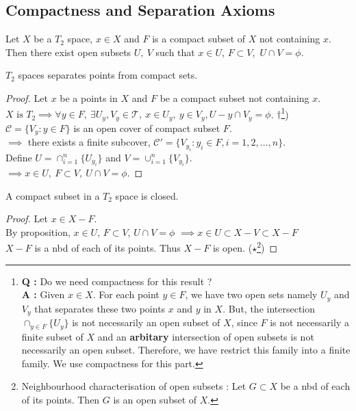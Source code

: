 \subsection{Compactness and Separation Axioms}
\cite[chapter 7 \S 2.1-10]{joshi}
\begin{proposition}
	Let $X$ be a $T_2$ space, $x \in X$ and $F$ is a compact subset of $X$ not containing $x$.
	Then there exist open subsets $U,\ V$ such that $x \in U$, $F \subset V$,\ $U \cap V = \phi$.
\end{proposition}
\begin{commentary}
	$T_2$ spaces separates points from compact sets.
\end{commentary}
\begin{proof}
	Let $x$ be a points in $X$ and $F$ be a compact subset not containing $x$.\\
	$X \text{ is }T_2 \implies \forall y \in F,\ \exists U_y,V_y \in \mathcal{T},\ x \in U_y,\ y \in V_y, U-y \cap V_y = \phi$.
	$\dag$\footnote{\textbf{Q :} Do we need compactness for this result ? \\ \indent\indent\textbf{A :} Given $x \in X$.
	For each point $y \in F$, we have two open sets namely $U_y$ and $V_y$ that separates these two points $x$ and $y$ in $X$.
	But, the intersection ${\displaystyle \cap_{y \in F} \{ U_y \}}$ is not necessarily an open subset of $X$, since $F$ is not necessarily a finite subset of $X$ and an \textbf{arbitary} intersection of open subsets is not necessarily an open subset.
	Therefore, we have restrict this family into a finite family.
	We use compactness for this part.})\\
	$\mathcal{C} = \{ V_y : y \in F \}$ is an open cover of compact subset $F$.\\
	$\implies$ there exists a finite subcover, $\mathcal{C'} = \{ V_{y_i} : y_i \in F, i = 1,2,\dots,n \}$.\\
	Define $U = \cap_{i = 1}^n \{U_{y_i}\}$ and $V = \cup_{i = 1}^n \{V_{y_i}\}$.\\
	$\implies x \in U,\ F \subset V,\ U \cap V = \phi$.
\end{proof}

\begin{corollary}
	A compact subset in a $T_2$ space is closed.
\end{corollary}
\begin{proof}
	Let $x \in X-F$.\\
	By proposition, $x \in U$, $F \subset V$, $U \cap V = \phi$
	$\implies x \in U \subset X-V \subset X-F$\\
	$X-F$ is a nbd of each of its points.
	Thus $X-F$ is open.
	($\star$\footnote{Neighbourhood characterisation of open subsets : Let $G \subset X$ be a nbd of each of its points.
	Then $G$ is an open subset of $X$.})
\end{proof}

